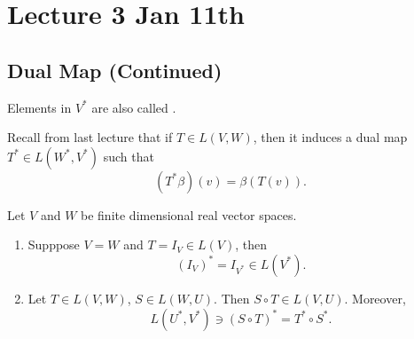 \documentclass[notoc,notitlepage]{tufte-book}
\begin{document}


\chapter{Lecture 3 Jan 11th}%
\label{chp:lecture_3_jan_11th}

\section{Dual Map (Continued)}%
\label{sec:dual_map_continued}

\begin{note}
  Elements in $V^*$ are also called .
\end{note}

Recall from last lecture that if $T \in L(V, W)$, then it
induces a dual map $T^* \in L(W^*, V^*)$ such that
\begin{equation*}
  (T^* \beta)(v) = \beta (T(v)).
\end{equation*}

\begin{propo}\label{propo:identity_and_composition_of_the_dual_map}
  Let $V$ and $W$ be finite dimensional real vector spaces.
  \begin{enumerate}
    \item Supppose $V = W$ and $T = I_V \in L(V)$, then
      \begin{equation*}
        (I_V)^* = I_{V^*} \in L(V^*).
      \end{equation*}

    \item Let $T \in L(V, W)$, $S \in L(W, U)$. Then
      $S \circ T \in L(V, U)$. Moreover,
      \begin{equation*}
        L \left( U^*, V^* \right) \ni ( S \circ T )^* = T^* \circ S^*.
      \end{equation*}
  \end{enumerate}
\end{propo}
\end{document}

